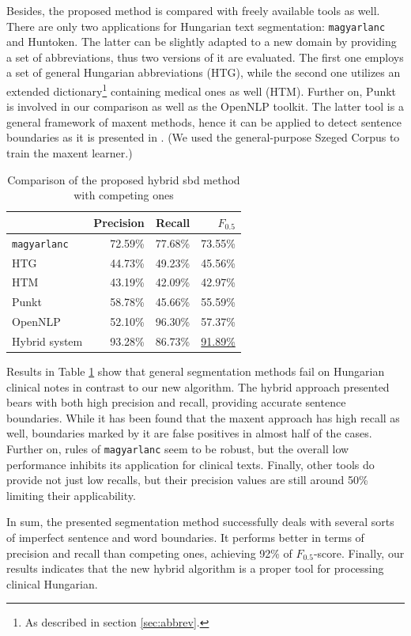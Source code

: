 Besides, the proposed method is compared with freely available tools as well.
There are only two applications for Hungarian text segmentation: \texttt{magyarlanc} and Huntoken.
The latter can be slightly adapted to a new domain by providing a set of abbreviations, thus two versions of it are evaluated. 
The first one employs a set of general Hungarian abbreviations (HTG), while the second one utilizes an extended dictionary\footnote{As described in section \ref{sec:abbrev}.} containing medical ones as well (HTM). 
Further on, Punkt \cite{kiss2006unsupervised} is involved in our comparison as well as the OpenNLP \cite{Baldridge2002} toolkit. 
The latter tool is a general framework of \acrlong{maxent} methods, hence it can be applied to detect sentence boundaries as it is presented in \cite{reynar1997maximum}.
(We used the general-purpose Szeged Corpus to train the \acrlong{maxent} learner.) 

\begin{table}[h]
\centering
\caption{Comparison of the proposed hybrid \acrshort{sbd} method with competing ones}
\label{tab:comparison}
\begin{tabular}{ l r r r} 
\hline
& Precision & Recall & $F_{0.5}$ \\
\hline
\texttt{magyarlanc} & 72.59\% & 77.68\% & 73.55\% \\
HTG & 44.73\% & 49.23\% & 45.56\% \\
HTM & 43.19\% & 42.09\% & 42.97\% \\
Punkt & 58.78\% & 45.66\% & 55.59\%  \\
OpenNLP & 52.10\% & 96.30\% & 57.37\% \\
Hybrid system & 93.28\% & 86.73\% & \underline{91.89\%} \\
\hline
\end{tabular}
\end{table}

Results in Table \ref{tab:comparison} show that general segmentation methods fail on Hungarian clinical notes in contrast to our new algorithm. 
The hybrid approach presented bears with both high precision and recall, providing accurate sentence boundaries.
While it has been found that the \acrshort{maxent} approach has high recall as well, boundaries marked by it are false positives in almost half of the cases. 
Further on, rules of \texttt{magyarlanc} seem to be robust, but the overall low performance inhibits its application for clinical texts. 
Finally, other tools do provide not just low recalls, but their precision values are still around 50\% limiting their applicability. 

In sum, the presented segmentation method successfully deals with several sorts of imperfect sentence and word boundaries.
It performs better in terms of precision and recall than competing ones, achieving 92\% of $F_{0.5}$-score. 
Finally, our results indicates that the new hybrid algorithm is a proper tool for processing clinical Hungarian.


